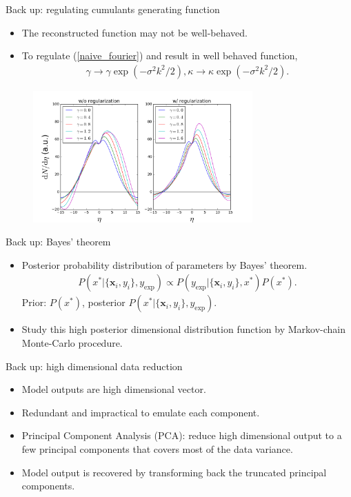 \documentclass[11pt]{beamer}
\begin{document}
\begin{frame}[noframenumbering]{Back up: regulating cumulants generating function}
\begin{itemize}
\item The reconstructed function may not be well-behaved.
\item To regulate (\ref{naive_fourier}) and result in well behaved function,
\begin{eqnarray}
 \gamma \rightarrow \gamma\exp\left(-\sigma^2k^2/2\right), \kappa \rightarrow \kappa\exp\left(-\sigma^2k^2/2\right). 
\end{eqnarray}
\end{itemize}
\begin{center}
\begin{figure}
\includegraphics[width=0.75\textwidth]{pics/regulate.png}
\end{figure}
\end{center}
\end{frame}

\begin{frame}{Back up: Bayes' theorem}
\begin{itemize}
\item Posterior probability distribution of parameters by Bayes' theorem.
\begin{eqnarray}
P(x^* | \{\mathbf{x}_i, y_i\}, y_{\textrm{exp}} )
 \propto P(y_{\textrm{exp}}|\{\mathbf{x}_i, y_i\}, x^*) P(x^*).
\end{eqnarray}
Prior: $P(x^*)$, posterior $P(x^* | \{\mathbf{x}_i, y_i\}, y_{\textrm{exp}} )$.
\item Study this high posterior dimensional distribution function by Markov-chain Monte-Carlo procedure.
\end{itemize}
\end{frame}

\begin{frame}[noframenumbering]{Back up: high dimensional data reduction}
\begin{itemize}
\item Model outputs are high dimensional vector.
\item Redundant and impractical to emulate each component.
\item Principal Component Analysis (PCA): reduce high dimensional output to a few principal components that covers most of the data variance.
\item Model output is recovered by transforming back the truncated principal components.
\end{itemize}
\end{frame}
\end{document}
